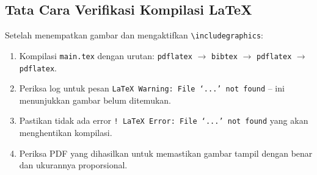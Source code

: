 \subsection{Tata Cara Verifikasi Kompilasi \LaTeX{}}

Setelah menempatkan gambar dan mengaktifkan \texttt{\textbackslash{}includegraphics}:
\begin{enumerate}
    \item Kompilasi \texttt{main.tex} dengan urutan: \texttt{pdflatex} $\rightarrow$ \texttt{bibtex} $\rightarrow$ \texttt{pdflatex} $\rightarrow$ \texttt{pdflatex}.
    \item Periksa log untuk pesan \texttt{LaTeX Warning: File `...' not found} -- ini menunjukkan gambar belum ditemukan.
    \item Pastikan tidak ada error \texttt{! LaTeX Error: File `...' not found} yang akan menghentikan kompilasi.
    \item Periksa PDF yang dihasilkan untuk memastikan gambar tampil dengan benar dan ukurannya proporsional.
\end{enumerate}
